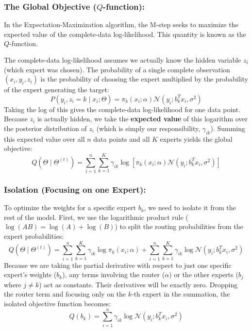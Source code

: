 \documentclass[twoside, 10pt]{article}
\begin{document}
\subsubsection{The Global Objective ($Q$-function):}
\begin{sloppypar}
In the Expectation-Maximization algorithm, the M-step seeks to maximize the expected value of the complete-data log-likelihood. This quantity is known as the $Q$-function.
\end{sloppypar}
The complete-data log-likelihood assumes we actually know the hidden variable $z_i$ (which expert was chosen). The probability of a single complete observation $(x_i, y_i, z_i)$ is the probability of choosing the expert multiplied by the probability of the expert generating the target:
\[
P(y_i, z_i=k \mid x_i; \Theta) = \pi_k(x_i; \alpha) \mathcal{N}(y_i; b_k^T x_i, \sigma^2)
\]
Taking the log of this gives the complete-data log-likelihood for one data point. Because $z_i$ is actually hidden, we take the \textbf{expected value} of this logarithm over the posterior distribution of $z_i$ (which is simply our responsibility, $\gamma_{ik}$).
Summing this expected value over all $n$ data points and all $K$ experts yields the global objective:
\[
Q(\Theta \mid \Theta^{(t)}) = \sum_{i=1}^n \sum_{k=1}^K \gamma_{ik} \log \left[ \pi_k(x_i; \alpha) \mathcal{N}(y_i; b_k^T x_i, \sigma^2) \right]
\]
\subsubsection{Isolation (Focusing on one Expert):}
To optimize the weights for a specific expert $b_k$, we need to isolate it from the rest of the model. 
First, we use the logarithmic product rule ($\log(AB) = \log(A) + \log(B)$) to split the routing probabilities from the expert probabilities:
\[
Q(\Theta \mid \Theta^{(t)}) = \sum_{i=1}^n \sum_{k=1}^K \gamma_{ik} \log \pi_k(x_i; \alpha) + \sum_{i=1}^n \sum_{k=1}^K \gamma_{ik} \log \mathcal{N}(y_i; b_k^T x_i, \sigma^2)
\]
Because we are taking the partial derivative with respect to just one specific expert's weights ($b_k$), any terms involving the router ($\alpha$) or the other experts ($b_j$ where $j \neq k$) act as constants. Their derivatives will be exactly zero. 
Dropping the router term and focusing only on the $k$-th expert in the summation, the isolated objective function becomes:
\[
Q(b_k) = \sum_{i=1}^n \gamma_{ik} \log \mathcal{N}(y_i; b_k^T x_i, \sigma^2)
\]
\end{document}
